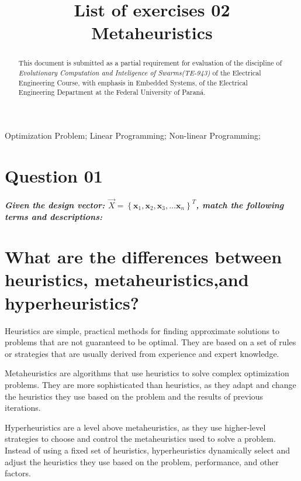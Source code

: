 \documentclass[conference]{IEEEtran}
\begin{document}
\title{List of exercises 02\\
	Metaheuristics}
\author{
}


\maketitle

\begin{abstract}
	This document is submitted as a partial requirement for	evaluation of the discipline of \textit{Evolutionary Computation and Inteligence of Swarms(TE-943)} of the Electrical Engineering Course, with emphasis in Embedded Systems, of the Electrical Engineering Department at the Federal University of Paraná.
\end{abstract}


\begin{IEEEkeywords}Optimization Problem; Linear Programming; Non-linear Programming;\end{IEEEkeywords}

\section{Question 01}

\textbf{\textit{Given the design vector: $\vec{X} = \left\{ \mathbf{x}_{1}, \mathbf{x}_{2}, \mathbf{x}_{3}, \hdots \mathbf{x}_{n}\right\}^T$, match the following terms and descriptions:}}

\section{What are the differences between heuristics, metaheuristics,and hyperheuristics?}

Heuristics are simple, practical methods for finding approximate solutions to problems that are not guaranteed to be optimal. They are based on a set of rules or strategies that are usually derived from experience and expert knowledge.

Metaheuristics are algorithms that use heuristics to solve complex optimization problems. They are more sophisticated than heuristics, as they adapt and change the heuristics they use based on the problem and the results of previous iterations.

Hyperheuristics are a level above metaheuristics, as they use higher-level strategies to choose and control the metaheuristics used to solve a problem. Instead of using a fixed set of heuristics, hyperheuristics dynamically select and adjust the heuristics they use based on the problem, performance, and other factors.
\end{document}
